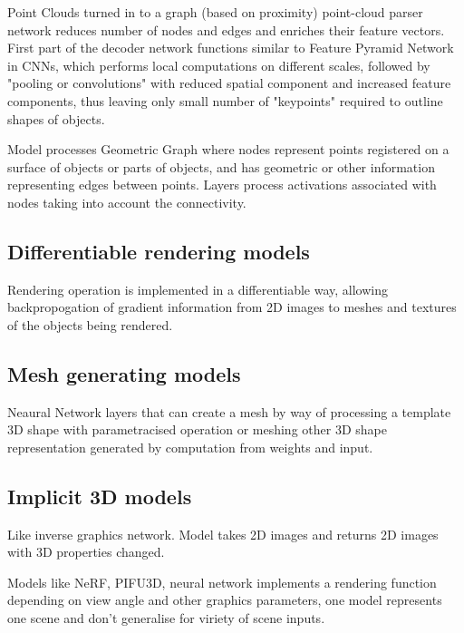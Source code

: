 Point Clouds turned in to a graph (based on proximity) point-cloud parser network reduces number of nodes and edges and enriches their feature vectors. First part of the decoder network functions similar to Feature Pyramid Network in CNNs, which performs local computations on different scales, followed by "pooling or convolutions" with reduced spatial component and increased feature components, thus leaving only small number of "keypoints" required to outline shapes of objects.


Model processes Geometric Graph where nodes represent points registered on a surface of objects or parts of objects, and has geometric or other information representing edges between points. Layers process activations associated with nodes taking into account the connectivity.

\subsection{Differentiable rendering models}

Rendering operation is implemented in a differentiable way, allowing backpropogation of gradient information from 2D images to meshes and textures of the objects being rendered.

\subsection{Mesh generating models}

Neaural Network layers that can create a mesh by way of processing a template 3D shape with parametracised operation or meshing other 3D shape representation generated by computation from weights and input.

\subsection{Implicit 3D models}
Like inverse graphics network. Model takes 2D images and returns 2D images with 3D properties changed. 

Models like NeRF, PIFU3D, neural network implements a rendering function depending on view angle and other graphics parameters, one model represents one scene and don't generalise for viriety of scene inputs.
